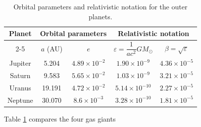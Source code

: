 \documentclass{article}
\begin{document}
\begin{table}[H]
\centering
\caption{Orbital parameters and relativistic notation for the outer planets.}
\label{tab:outer_planets}
\renewcommand{\arraystretch}{1.5}
\begin{tabular}{|c|c|c|c|c|}
\hline
\multirow{2}{*}{\textbf{Planet}} & 
\multicolumn{2}{c|}{\textbf{Orbital parameters}} & \multicolumn{2}{c|}{\textbf{Relativistic notation}} \\
\cline{2-5}
& $a$ (AU) & $e$ & $\varepsilon = \dfrac{1}{ac^2}GM_{\odot}$ & $\beta = \sqrt{\varepsilon}$ \\
\hline
Jupiter & 5.204  & $4.89 \times 10^{-2}$ & $1.90 \times 10^{-9}$  & $4.36 \times 10^{-5}$ \\
\hline
Saturn  & 9.583  & $5.65 \times 10^{-2}$ & $1.03 \times 10^{-9}$  & $3.21 \times 10^{-5}$ \\
\hline
Uranus  & 19.191 & $4.72 \times 10^{-2}$ & $5.14 \times 10^{-10}$ & $2.27 \times 10^{-5}$ \\
\hline
Neptune & 30.070 & $8.6  \times 10^{-3}$ & $3.28 \times 10^{-10}$ & $1.81 \times 10^{-5}$ \\
\hline
\end{tabular}
\end{table}

Table \ref{tab:outer_planets} compares the four gas giants




\end{document}
